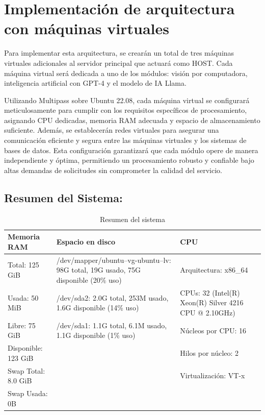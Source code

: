 \section*{Implementación de arquitectura con máquinas virtuales}

Para implementar esta arquitectura, se crearán un total de tres máquinas virtuales adicionales al servidor principal que actuará como HOST. Cada máquina virtual será dedicada a uno de los módulos: visión por computadora, inteligencia artificial con GPT-4 y el modelo de IA Llama.

Utilizando Multipass sobre Ubuntu 22.08, cada máquina virtual se configurará meticulosamente para cumplir con los requisitos específicos de procesamiento, asignando CPU dedicadas, memoria RAM adecuada y espacio de almacenamiento suficiente. Además, se establecerán redes virtuales para asegurar una comunicación eficiente y segura entre las máquinas virtuales y los sistemas de bases de datos. Esta configuración garantizará que cada módulo opere de manera independiente y óptima, permitiendo un procesamiento robusto y confiable bajo altas demandas de solicitudes sin comprometer la calidad del servicio.

\subsection*{Resumen del Sistema:}

\renewcommand{\arraystretch}{1.3} %
\begin{table}[H]
\centering
\begin{tabularx}{\textwidth}{|m{4cm}|m{6cm}|m{4cm}|}
\hline
\textbf{Memoria RAM} & \textbf{Espacio en disco} & \textbf{CPU} \\ \hline
Total: 125 GiB & /dev/mapper/ubuntu--vg-ubuntu--lv: 98G total, 19G usado, 75G disponible (20\% uso) & Arquitectura: x86\_64 \\ \hline
Usada: 50 MiB & /dev/sda2: 2.0G total, 253M usado, 1.6G disponible (14\% uso) & CPUs: 32 (Intel(R) Xeon(R) Silver 4216 CPU @ 2.10GHz) \\ \hline
Libre: 75 GiB & /dev/sda1: 1.1G total, 6.1M usado, 1.1G disponible (1\% uso) & Núcleos por CPU: 16 \\ \hline
Disponible: 123 GiB & & Hilos por núcleo: 2 \\ \hline
Swap Total: 8.0 GiB & & Virtualización: VT-x \\ \hline
Swap Usada: 0B & & \\ \hline
\end{tabularx}
\caption{Resumen del sistema}
\label{tab:system_summary}
\end{table}

